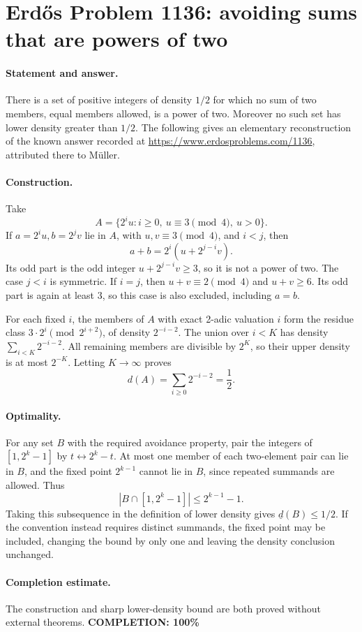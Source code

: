 \section*{Erd\H{o}s Problem 1136: avoiding sums that are powers of two}

\paragraph{Statement and answer.}
There is a set of positive integers of density \(1/2\) for which no sum of two members, equal members allowed, is a power of two. Moreover no such set has lower density greater than \(1/2\). The following gives an elementary reconstruction of the known answer recorded at \url{https://www.erdosproblems.com/1136}, attributed there to M\"uller.

\paragraph{Construction.}
Take
\[
 A=\{2^i u:i\geq0,\ u\equiv3\pmod4,\ u>0\}.
\]
If \(a=2^iu,b=2^jv\) lie in \(A\), with \(u,v\equiv3\pmod4\), and \(i<j\), then
\[
 a+b=2^i(u+2^{j-i}v).
\]
Its odd part is the odd integer \(u+2^{j-i}v\geq3\), so it is not a power of two. The case \(j<i\) is symmetric. If \(i=j\), then \(u+v\equiv2\pmod4\) and \(u+v\geq6\). Its odd part is again at least \(3\), so this case is also excluded, including \(a=b\).

For each fixed \(i\), the members of \(A\) with exact 2-adic valuation \(i\) form the residue class \(3\cdot2^i\pmod{2^{i+2}}\), of density \(2^{-i-2}\). The union over \(i<K\) has density
\(\sum_{i<K}2^{-i-2}\). All remaining members are divisible by \(2^K\), so their upper density is at most \(2^{-K}\). Letting \(K\to\infty\) proves
\[
 d(A)=\sum_{i\geq0}2^{-i-2}=\frac12.
\]

\paragraph{Optimality.}
For any set \(B\) with the required avoidance property, pair the integers of \([1,2^k-1]\) by \(t\leftrightarrow2^k-t\). At most one member of each two-element pair can lie in \(B\), and the fixed point \(2^{k-1}\) cannot lie in \(B\), since repeated summands are allowed. Thus
\[
 |B\cap[1,2^k-1]|\leq2^{k-1}-1.
\]
Taking this subsequence in the definition of lower density gives
\(\underline d(B)\leq1/2\). If the convention instead requires distinct summands, the fixed point may be included, changing the bound by only one and leaving the density conclusion unchanged.

\paragraph{Completion estimate.}
The construction and sharp lower-density bound are both proved without external theorems.
\textbf{COMPLETION: 100\%}
